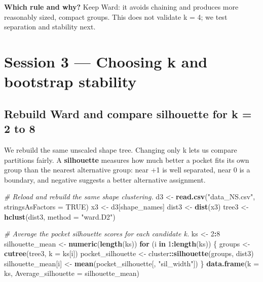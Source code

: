 \documentclass[
  10pt,
]{article}
\newenvironment{Shaded}{\begin{snugshade}}{\end{snugshade}}
\newcommand{\AttributeTok}[1]{\textcolor[rgb]{0.13,0.29,0.53}{#1}}
\newcommand{\CommentTok}[1]{\textcolor[rgb]{0.56,0.35,0.01}{\textit{#1}}}
\newcommand{\ConstantTok}[1]{\textcolor[rgb]{0.56,0.35,0.01}{#1}}
\newcommand{\ControlFlowTok}[1]{\textcolor[rgb]{0.13,0.29,0.53}{\textbf{#1}}}
\newcommand{\DecValTok}[1]{\textcolor[rgb]{0.00,0.00,0.81}{#1}}
\newcommand{\FunctionTok}[1]{\textcolor[rgb]{0.13,0.29,0.53}{\textbf{#1}}}
\newcommand{\NormalTok}[1]{#1}
\newcommand{\OtherTok}[1]{\textcolor[rgb]{0.56,0.35,0.01}{#1}}
\newcommand{\SpecialCharTok}[1]{\textcolor[rgb]{0.81,0.36,0.00}{\textbf{#1}}}
\newcommand{\StringTok}[1]{\textcolor[rgb]{0.31,0.60,0.02}{#1}}
\begin{document}
\textbf{Which rule and why?} Keep Ward: it avoids chaining and produces
more reasonably sized, compact groups. This does not validate k = 4; we
test separation and stability next.

\section{Session 3 --- Choosing k and bootstrap
stability}\label{session-3-choosing-k-and-bootstrap-stability}

\subsection{Rebuild Ward and compare silhouette for k = 2 to
8}\label{rebuild-ward-and-compare-silhouette-for-k-2-to-8}

We rebuild the same unscaled shape tree. Changing only k lets us compare
partitions fairly. A \textbf{silhouette} measures how much better a
pocket fits its own group than the nearest alternative group: near +1 is
well separated, near 0 is a boundary, and negative suggests a better
alternative assignment.

\begin{Shaded}
\begin{Highlighting}[]
\CommentTok{\# Reload and rebuild the same shape clustering.}
\NormalTok{d3 }\OtherTok{\textless{}{-}} \FunctionTok{read.csv}\NormalTok{(}\StringTok{"data\_NS.csv"}\NormalTok{, }\AttributeTok{stringsAsFactors =} \ConstantTok{TRUE}\NormalTok{)}
\NormalTok{x3 }\OtherTok{\textless{}{-}}\NormalTok{ d3[shape\_names]}
\NormalTok{dist3 }\OtherTok{\textless{}{-}} \FunctionTok{dist}\NormalTok{(x3)}
\NormalTok{tree3 }\OtherTok{\textless{}{-}} \FunctionTok{hclust}\NormalTok{(dist3, }\AttributeTok{method =} \StringTok{"ward.D2"}\NormalTok{)}

\CommentTok{\# Average the pocket silhouette scores for each candidate k.}
\NormalTok{ks }\OtherTok{\textless{}{-}} \DecValTok{2}\SpecialCharTok{:}\DecValTok{8}
\NormalTok{silhouette\_mean }\OtherTok{\textless{}{-}} \FunctionTok{numeric}\NormalTok{(}\FunctionTok{length}\NormalTok{(ks))}
\ControlFlowTok{for}\NormalTok{ (i }\ControlFlowTok{in} \DecValTok{1}\SpecialCharTok{:}\FunctionTok{length}\NormalTok{(ks)) \{}
\NormalTok{  groups }\OtherTok{\textless{}{-}} \FunctionTok{cutree}\NormalTok{(tree3, }\AttributeTok{k =}\NormalTok{ ks[i])}
\NormalTok{  pocket\_silhouette }\OtherTok{\textless{}{-}}\NormalTok{ cluster}\SpecialCharTok{::}\FunctionTok{silhouette}\NormalTok{(groups, dist3)}
\NormalTok{  silhouette\_mean[i] }\OtherTok{\textless{}{-}} \FunctionTok{mean}\NormalTok{(pocket\_silhouette[, }\StringTok{"sil\_width"}\NormalTok{])}
\NormalTok{\}}
\FunctionTok{data.frame}\NormalTok{(}\AttributeTok{k =}\NormalTok{ ks, }\AttributeTok{Average\_silhouette =}\NormalTok{ silhouette\_mean)}
\end{Highlighting}
\end{Shaded}
\end{document}
